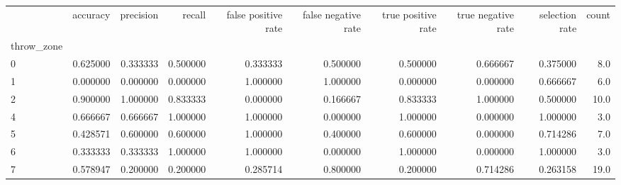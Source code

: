 \begin{tabular}{lrrrrrrrrr}
\toprule
{} &  accuracy &  precision &    recall &  false positive rate &  false negative rate &  true positive rate &  true negative rate &  selection rate &  count \\
throw\_zone &           &            &           &                      &                      &                     &                     &                 &        \\
\midrule
0          &  0.625000 &   0.333333 &  0.500000 &             0.333333 &             0.500000 &            0.500000 &            0.666667 &        0.375000 &    8.0 \\
1          &  0.000000 &   0.000000 &  0.000000 &             1.000000 &             1.000000 &            0.000000 &            0.000000 &        0.666667 &    6.0 \\
2          &  0.900000 &   1.000000 &  0.833333 &             0.000000 &             0.166667 &            0.833333 &            1.000000 &        0.500000 &   10.0 \\
4          &  0.666667 &   0.666667 &  1.000000 &             1.000000 &             0.000000 &            1.000000 &            0.000000 &        1.000000 &    3.0 \\
5          &  0.428571 &   0.600000 &  0.600000 &             1.000000 &             0.400000 &            0.600000 &            0.000000 &        0.714286 &    7.0 \\
6          &  0.333333 &   0.333333 &  1.000000 &             1.000000 &             0.000000 &            1.000000 &            0.000000 &        1.000000 &    3.0 \\
7          &  0.578947 &   0.200000 &  0.200000 &             0.285714 &             0.800000 &            0.200000 &            0.714286 &        0.263158 &   19.0 \\
\bottomrule
\end{tabular}
